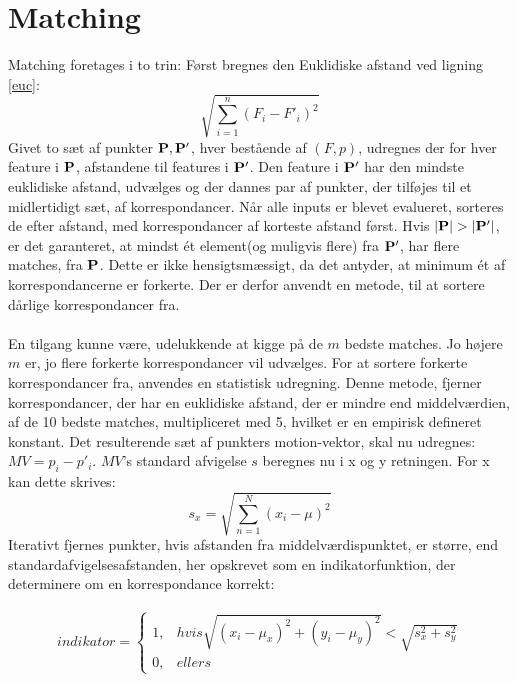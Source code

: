 \section{Matching}
\label{sec:match}
Matching foretages i to trin: Først bregnes den Euklidiske afstand ved ligning \eqref{euc}:
\begin{equation}
\sqrt{\sum\limits_{i=1}^n(F_i-F'_i)^2}
\label{euc}
\end{equation}
Givet to sæt af punkter $\bold{P}, \bold{P}'$, hver bestående af $(F, p)$, udregnes der for hver feature i $\bold{P}$, afstandene til features i $\bold{P}'$. Den feature i $\bold{P}'$ har den mindste euklidiske afstand, udvælges og der dannes par af punkter, der tilføjes til et midlertidigt sæt, af korrespondancer. Når alle inputs er blevet evalueret, sorteres de efter afstand, med korrespondancer af korteste afstand først. Hvis $|\bold{P}| > |\bold{P}'|$, er det garanteret, at mindst ét element(og muligvis flere) fra $\bold{P}'$, har flere matches, fra $\bold{P}$. Dette er ikke hensigtsmæssigt, da det antyder, at minimum ét af korrespondancerne er forkerte. Der er derfor anvendt en metode, til at sortere dårlige korrespondancer fra.
\\
\\
En tilgang kunne være, udelukkende at kigge på de $m$ bedste matches. Jo højere $m$ er, jo flere forkerte korrespondancer vil udvælges. For at sortere forkerte korrespondancer fra, anvendes en statistisk udregning. Denne metode, fjerner korrespondancer, der har en euklidiske afstand, der er mindre end middelværdien, af de 10 bedste matches, multipliceret med 5, hvilket er en empirisk defineret konstant. Det resulterende sæt af punkters motion-vektor, skal nu udregnes: $MV = p_i - p'_i$. 
$MV$'s standard afvigelse $s$ beregnes nu i x og y retningen. For x kan dette skrives: 
\begin{equation}
s_x = \sqrt{ \sum \limits_{n=1}^N (x_i  - \mu)^2 }
\label{pis}
\end{equation}
Iterativt fjernes punkter, hvis afstanden fra middelværdispunktet, er større, end standardafvigelsesafstanden, her opskrevet som en indikatorfunktion, der determinere om en korrespondance korrekt:

\begin{equation}
\begin{split}
indikator = 
\begin{cases}
1,&hvis \sqrt{(x_i - \mu_x)^2 + (y_i - \mu_y)^2} < \sqrt{s_x^2 + s_y^2} \\
0,& ellers
\end{cases}
\end{split}
\label{indikator}
\end{equation}


